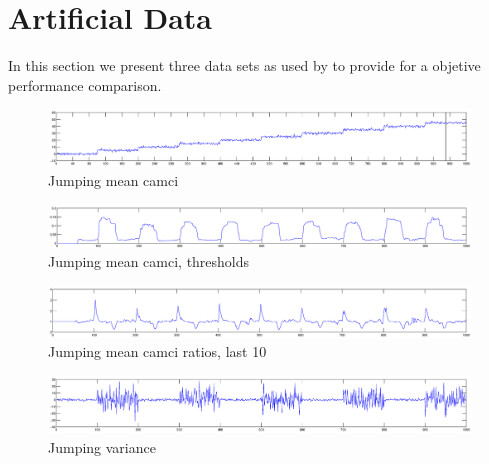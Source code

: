 \section{Artificial Data}\label{sec:artificial_data}
In this section we present three data sets as used by \cite{camci2010change,takeuchi2006unifying} to provide for a objetive performance comparison.

\begin{figure}
\centering
  \includegraphics[width=1\textwidth]{./Figures/notes/jumping_mean_camci.eps}
  \caption[Jumping mean camci]{Jumping mean camci}
\end{figure}

\begin{figure}
\centering
  \includegraphics[width=1\textwidth]{./Figures/notes/jumping_mean_camci_thresholds.eps}
  \caption[Jumping mean camci thresholds]{Jumping mean camci, thresholds}
\end{figure}

\begin{figure}
\centering
  \includegraphics[width=1\textwidth]{./Figures/notes/jumping_mean_camci_ratios_10.eps}
  \caption[Jumping mean camci ratios]{Jumping mean camci ratios, last 10}
  \label{fig:jumping_mean_ratios}
\end{figure}

\begin{figure}
\centering
  \includegraphics[width=1\textwidth]{./Figures/notes/jumping_variance.eps}
  \caption[Jumping variance]{Jumping variance}
\end{figure}

